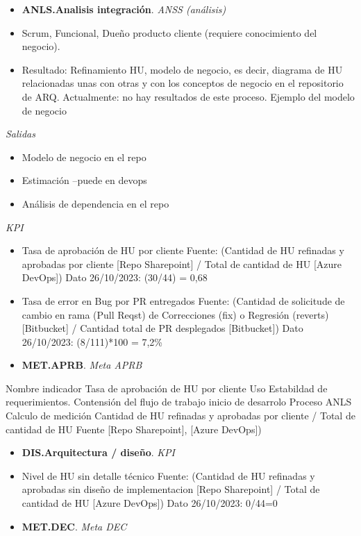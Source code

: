 \documentclass[
  paper=a4,
  ,captions=tableheading
]{scrartcl}
\providecommand{\tightlist}{%
  \setlength{\itemsep}{0pt}\setlength{\parskip}{0pt}}
\begin{document}
\begin{itemize}
\item
  \textbf{ANLS.Analisis integración}. \emph{ANSS (análisis)}
\item
  Scrum, Funcional, Dueño producto cliente (requiere conocimiento del
  negocio).
\item
  Resultado: Refinamiento HU, modelo de negocio, es decir, diagrama de
  HU relacionadas unas con otras y con los conceptos de negocio en el
  repositorio de ARQ. Actualmente: no hay resultados de este proceso.
  Ejemplo del modelo de negocio
\end{itemize}

\emph{Salidas}

\begin{itemize}
\tightlist
\item
  Modelo de negocio en el repo
\item
  Estimación --puede en devops
\item
  Análisis de dependencia en el repo
\end{itemize}

\emph{KPI}

\begin{itemize}
\item
  Tasa de aprobación de HU por cliente Fuente: (Cantidad de HU refinadas
  y aprobadas por cliente {[}Repo Sharepoint{]} / Total de cantidad de
  HU {[}Azure DevOps{]}) Dato 26/10/2023: (30/44) = 0,68
\item
  Tasa de error en Bug por PR entregados Fuente: (Cantidad de solicitude
  de cambio en rama (Pull Reqst) de Correcciones (fix) o Regresión
  (reverts) {[}Bitbucket{]} / Cantidad total de PR desplegados
  {[}Bitbucket{]}) Dato 26/10/2023: (8/111)*100 = 7,2\%
\item
  \textbf{MET.APRB}. \emph{Meta APRB}
\end{itemize}

Nombre indicador Tasa de aprobación de HU por cliente Uso Estabildad de
requerimientos. Contensión del flujo de trabajo inicio de desarrolo
Proceso ANLS Calculo de medición Cantidad de HU refinadas y aprobadas
por cliente / Total de cantidad de HU Fuente {[}Repo Sharepoint{]},
{[}Azure DevOps{]})

\begin{itemize}
\item
  \textbf{DIS.Arquitectura / diseño}. \emph{KPI}
\item
  Nivel de HU sin detalle técnico Fuente: (Cantidad de HU refinadas y
  aprobadas sin diseño de implementacion {[}Repo Sharepoint{]} / Total
  de cantidad de HU {[}Azure DevOps{]}) Dato 26/10/2023: 0/44=0
\item
  \textbf{MET.DEC}. \emph{Meta DEC}
\end{itemize}
\end{document}
